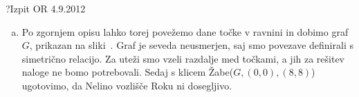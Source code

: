 \begin{naloga}{?}{Izpit OR 4.9.2012}
\begin{odgovor}
\begin{enumerate}[(a)]
\item Po zgornjem opisu lahko torej povežemo dane točke v ravnini in dobimo graf $G$, prikazan na sliki~\fig. 
Graf je seveda neusmerjen, saj smo povezave definirali s simetrično relacijo.
Za uteži smo vzeli razdalje med točkami, a jih za rešitev naloge ne bomo potrebovali.
Sedaj s klicem {\sc Žabe}($G, (0,0), (8,8)$) ugotovimo,
da Nelino vozlišče Roku ni dosegljivo.
\begin{slika}
\pgfslika
{}
\end{slika}

\end{enumerate}
\end{odgovor}
\end{naloga}
